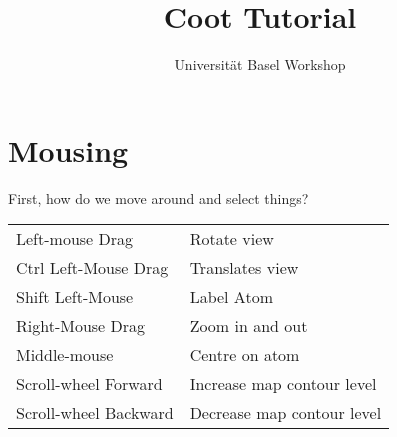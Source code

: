 \documentclass{article}
\title{Coot Tutorial}
\author{Universit\"at Basel Workshop}
\begin{document}
\maketitle
\tableofcontents
















\newpage

\section{Mousing}

First, how do we move around and select things?

\vspace{0.5cm}
  \begin{tabular}{ll}
    Left-mouse Drag & Rotate view \\
    Ctrl Left-Mouse Drag &  Translates view \\
    Shift Left-Mouse &  Label Atom\\
    Right-Mouse Drag &  Zoom in and out\index{zoom}\\
    Middle-mouse & Centre on atom\\
    Scroll-wheel Forward &  Increase map contour level\\
    Scroll-wheel Backward &  Decrease map contour level
  \end{tabular}
\vspace{0.5cm}
\end{document}
